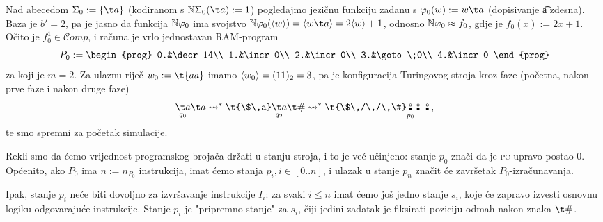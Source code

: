 \begin{primjer}
Nad abecedom $\Sigma_0:=\{\t a\}$ (kodiranom s $\N\Sigma_0(\t a):=1$) pogledajmo jezičnu funkciju zadanu s $\varphi_0(w):=w\t a$ (dopisivanje \t a zdesna). Baza je $b'=2$, pa je jasno da funkcija ${\mathbb N}\varphi_0$ ima svojstvo $\N\varphi_0(\kr w)=\kr{w\t a}=2\kr w+1$, odnosno ${\mathbb N}\varphi_0\approx f_0$, gdje je $f_0(x):=2x+1$. Očito je $f_0^1\in\mathcal Comp$, i računa je vrlo jednostavan RAM-program
\begin{equation}\label{eq:+aprog}
    P_0:=\begin{prog}
    0.&\decr14\\
    1.&\incr0\\
    2.&\incr0\\
    3.&\goto\;0\\
    4.&\incr0
    \end{prog}
\end{equation}
za koji je $m=2$. Za ulaznu riječ $w_0:=\t{aa}$ imamo $\langle w_0\rangle=(11)_2=3$, pa je konfiguracija Turingovog stroja kroz faze (početna, nakon prve faze i nakon druge faze)
\begin{equation}\label{eq:+afaze}
\renewcommand{\arraystretch}{0.1}
    \underset{q_0}{\t a}\t a\leadsto^*
    \t{\$\,a}\underset{q_2}{\t a}\t\#\leadsto^*
    \t{\$\,/\,/\,\#}
    \underset{p_0}{\begin{array}{@{}c@{}}
    \text\textopenbullet\\
    \text\textbullet
    \end{array}}
    \begin{array}{@{}c@{}}
    \text\textopenbullet\\
    \text\textbullet
    \end{array}
    \,\begin{array}{@{}c@{}}
    \text\textopenbullet\\
    \text\textbullet
    \end{array}\text,
\end{equation}
te smo spremni za početak simulacije. 
\end{primjer}

Rekli smo da ćemo vrijednost programskog brojača držati u stanju stroja, i to je već učinjeno: stanje $p_0$ znači da je \textsc{pc} upravo postao $0$. Općenito, ako $P_0$ ima $n:=n_{P_0}$ instrukcija, imat ćemo stanja $p_i,i\in[0..n]$, i ulazak u stanje $p_n$ značit će završetak $P_0$-izračunavanja.

Ipak, stanje $p_i$ neće biti dovoljno za izvršavanje instrukcije $I_i$: za svaki $i\le n$ imat ćemo još jedno stanje $s_i$, koje će zapravo izvesti osnovnu logiku odgovarajuće instrukcije. Stanje $p_i$ je "pripremno stanje" za $s_i$, čiji jedini zadatak je fiksirati poziciju odmah nakon znaka $\t\#$.

